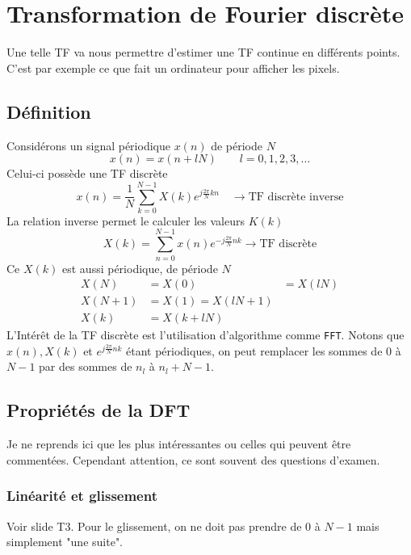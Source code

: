 \chapter{Transformation de Fourier discrète}
Une telle TF va nous permettre d'estimer une TF continue en différents points. C'est par 
exemple ce que fait un ordinateur pour afficher les pixels. 
\section{Définition}
Considérons un signal périodique $x(n)$ de période $N$
\begin{equation}
x(n) = x(n+lN)\qquad l =0,1,2,3,\dots
\end{equation}
Celui-ci possède une TF discrète
\begin{equation}
x(n) = \frac{1}{N}\sum_{k=0}^{N-1} X(k)e^{j\frac{2\pi}{N}kn}\quad\rightarrow\text{TF discrète inverse}
\end{equation}
La relation inverse permet le calculer les valeurs $K(k)$
\begin{equation}
X(k) = \sum_{n=0}^{N-1} x(n)e^{-j\frac{2\pi}{N}nk} \rightarrow\text{TF discrète}
\end{equation}
Ce $X(k)$ est aussi périodique, de période $N$
\begin{equation}
\begin{array}{lll}
X(N) &= X(0) &= X(lN)\\
X(N+1) &= X(1) = X(lN+1)\\
X(k) &= X(k+lN)
\end{array}
\end{equation}
L’Intérêt de la TF discrète est l'utilisation d'algorithme comme \texttt{FFT}. Notons que 
$x(n), X(k)$ et $e^{j\frac{2\pi}{N}nk}$ étant périodiques, on peut remplacer les sommes de 
0 à $N-1$ par des sommes de $n_l$ à $n_l+N-1$.

\section{Propriétés de la DFT}
Je ne reprends ici que les plus intéressantes ou celles qui peuvent être commentées. Cependant 
attention, ce sont souvent des questions d'examen.

	\subsection{Linéarité et glissement}
	Voir slide T3. Pour le glissement, on ne doit pas prendre de 0 à $N-1$ mais simplement 
	"une suite". 
	
